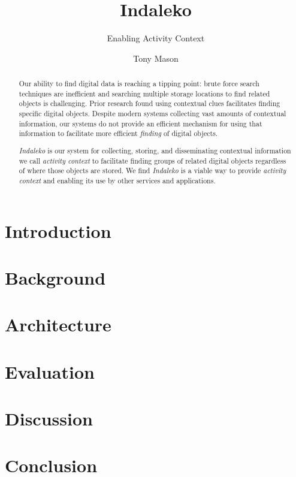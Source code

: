 \documentclass[sigconf,anonymous,review]{acmart}
\author{Tony Mason}
\title{Indaleko}
\subtitle{Enabling Activity Context}
\begin{document}
\begin{abstract}
    Our ability to find digital data is reaching a tipping point: brute force
    search techniques are inefficient and searching multiple storage locations
    to find related objects is challenging.  Prior research found using
    contextual clues facilitates finding specific digital objects. Despite
    modern systems collecting vast amounts of contextual information, our
    systems do not provide an efficient mechanism for using that information to
    facilitate more efficient \emph{finding} of digital objects.

    \emph{Indaleko} is our system for collecting, storing, and
    disseminating contextual information we call \emph{activity context} to
    facilitate finding groups of related digital objects regardless of where
    those objects are stored.  We find \emph{Indaleko} is a viable way to
    provide \emph{activity context} and enabling its use by other services and
    applications.
\end{abstract}

\maketitle

\section{Introduction}
\lipsum[1]

\section{Background}

\lipsum[2]

\section{Architecture}

\lipsum[3]

\section{Evaluation}

\lipsum[4]

\section{Discussion}

\lipsum[5]

\section{Conclusion}

\lipsum[6]

\nocite{*}
\clearpage


\end{document}
